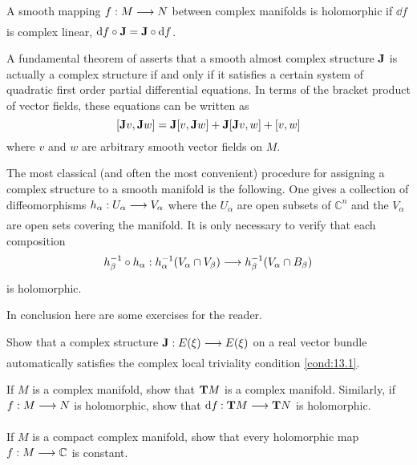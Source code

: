 \documentclass[../main]{subfiles}
\begin{document}
\begin{definition}
A smooth mapping $f:M\varrightarrow{} N$ between complex manifolds is holomorphic if $\dd{f}$ is complex linear, $\mathrm{d} f \circ \mathbf{J} = \mathbf{J} \circ \mathrm{d} f$.
\end{definition}

\begin{remark}
A fundamental theorem of \cite{newlander} asserts that a smooth almost complex structure $\mathbf{J}$ is actually a complex structure if and only if it satisfies a certain system of quadratic first order partial differential equations. In terms of the bracket product of vector fields, these equations can be written as
\[[\mathbf{J} v, \mathbf{J} w]= \mathbf{J}[v,\mathbf{J} w]+\mathbf{J}[\mathbf{J} v,w]+[v,w]\]
where $v$ and $w$ are arbitrary smooth vector fields on $M$.
\end{remark}
The most classical (and often the most convenient) procedure for
assigning a complex structure to a smooth manifold is the following. One gives a collection of diffeomorphisms $h_\alpha:U_\alpha\varrightarrow{}V_\alpha$ where the $U_\alpha$ are open subsets of $\mathbb{C}^n$ and the $V_\alpha$ are open sets covering the manifold. It is only necessary to verify that each composition
\[h_\beta^{-1} \circ h_\alpha: h_\alpha^{-1}(V_\alpha\cap V_\beta)\varrightarrow{} h_\beta^{-1}(V_\alpha\cap B_\beta)\]
is holomorphic.

In conclusion here are some exercises for the reader.

\begin{problem}
\label{prob:13.A} Show that a complex structure $\complexstructure: E(\xi)\varrightarrow{} E(\xi)$ on a real vector bundle automatically satisfies the complex local triviality condition \ref{cond:13.1}.
\end{problem}

\begin{problem}
\label{prob:13.B} If $M$ is a complex manifold, show that $\mathbf{T}M$ is a complex manifold. Similarly, if $f:M\varrightarrow{}N$ is holomorphic, show that $\differential{f}{}:\tangentTS{M}\varrightarrow{}\tangentTS{N}$ is holomorphic.
\end{problem}

\begin{problem}
\label{prob:13.C} If $M$ is a compact complex manifold, show that every holomorphic map $f:M\varrightarrow{}\mathbb{C}$ is constant.
\end{problem}
\end{document}
